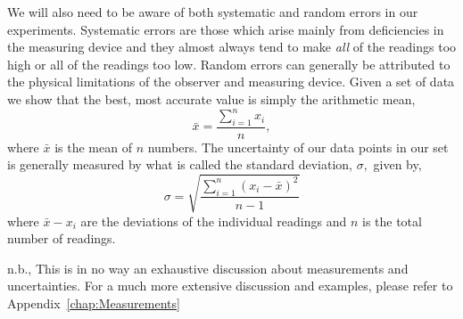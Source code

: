 \documentclass[main.tex]{subfiles}
\begin{document}
We will also need to be aware of both systematic and random errors in our experiments. Systematic errors are those which arise mainly from deficiencies in the measuring device and they almost always tend to make \emph{all} of the readings too high or all of the readings too low. Random errors can generally be attributed to the physical limitations of the observer and measuring device. Given a set of data we show that the best, most accurate value is simply the arithmetic mean,
\[
\bar{x}=\frac{\sum_{i=1}^{n}x_i}{n},
\]
where $\bar{x}$ is the mean of $n$ numbers. The uncertainty of our data points in our set is generally measured by what is called the standard deviation, $\sigma,$ given by,
\[
\sigma = \sqrt{\frac{\sum_{i=1}^{n} (x_i-\bar{x})^2}{n-1}}
\]
where $\bar{x}-x_i$ are the deviations of the individual readings and $n$ is the total number of readings.

n.b., This is in no way an exhaustive discussion about measurements and uncertainties. For a much more extensive discussion and examples, please refer to Appendix~\ref{chap:Measurements}
\end{document}
